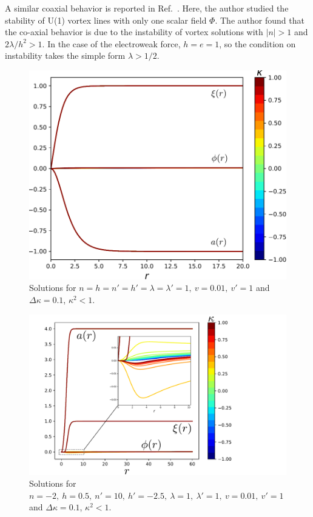 \documentclass[12pt,a4paper]{article}
\begin{document}
A similar coaxial behavior is reported in Ref.\ \cite{bogo1975}. Here, the author studied the stability of U(1) vortex lines with only one scalar field $\Phi$. The author found that the co-axial behavior is due to the instability of vortex solutions with $|n|>1$ and $2\lambda/h^2 > 1$. In the case of the electroweak force, $h=e = 1$, so the condition on instability takes the simple form $\lambda > 1/2$.

\begin{figure}
	\centering
	\includegraphics[scale=1]{n1h1np1hp1l1lp1v001vp1edited.pdf}
		\caption{Solutions for $n = h = n' = h'  = \lambda=\lambda' = 1,\ v =0.01,\ v' = 1 $ and $\Delta \kappa = 0.1$, $\kappa^2<1$.}
		\label{fig:sol1}
\end{figure}

\begin{figure}
	\centering
	\includegraphics[scale=1]{n-2h05np10hp-25l1lp1v001vp1combined.pdf}
		\caption{Solutions for $n = -2,\ h =0.5,\ n' = 10,\ h' = -2.5,\  \lambda=1,\ \lambda' = 1,\ v =0.01,\ v' = 1 $ and $\Delta \kappa = 0.1$, $\kappa^2<1$.}
		\label{fig:coaxial}
\end{figure}
\end{document}
